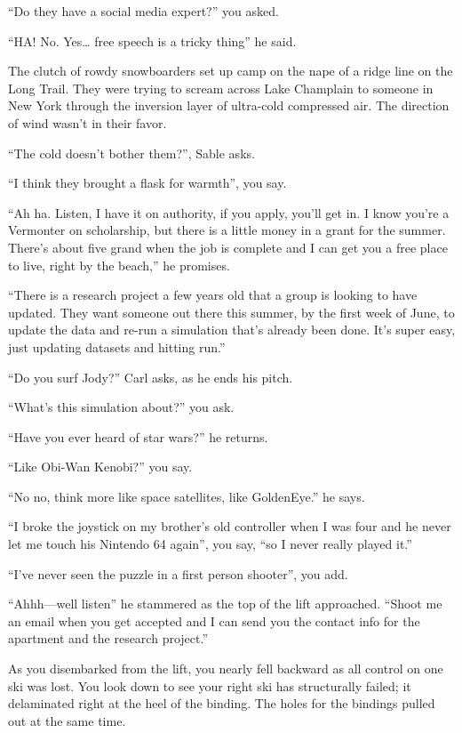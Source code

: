 \documentclass[17pt, twoside, a5paper, openright, extrafontsizes]{memoir}
\begin{document}
``Do they have a social media expert?'' you asked.

``HA! No. Yes\ldots{} free speech is a tricky thing'' he said.

The clutch of rowdy snowboarders set up camp on the nape of a ridge line
on the Long Trail. They were trying to scream across Lake Champlain to
someone in New York through the inversion layer of ultra-cold compressed
air. The direction of wind wasn't in their favor.

``The cold doesn't bother them?'', Sable asks.

``I think they brought a flask for warmth'', you say.

``Ah ha. Listen, I have it on authority, if you apply, you'll get in. I
know you're a Vermonter on scholarship, but there is a little money in a
grant for the summer. There's about five grand when the job is complete
and I can get you a free place to live, right by the beach,'' he
promises.

``There is a research project a few years old that a group is looking to
have updated. They want someone out there this summer, by the first week
of June, to update the data and re-run a simulation that's already been
done. It's super easy, just updating datasets and hitting run.''

``Do you surf Jody?'' Carl asks, as he ends his pitch.

``What's this simulation about?'' you ask.

``Have you ever heard of star wars?'' he returns.

``Like Obi-Wan Kenobi?'' you say.

``No no, think more like space satellites, like GoldenEye.'' he says.

``I broke the joystick on my brother's old controller when I was four
and he never let me touch his Nintendo 64 again'', you say, ``so I never
really played it.''

``I've never seen the puzzle in a first person shooter'', you add.

``Ahhh---well listen'' he stammered as the top of the lift approached.
``Shoot me an email when you get accepted and I can send you the contact
info for the apartment and the research project.''

As you disembarked from the lift, you nearly fell backward as all
control on one ski was lost. You look down to see your right ski has
structurally failed; it delaminated right at the heel of the binding.
The holes for the bindings pulled out at the same time.
\end{document}
